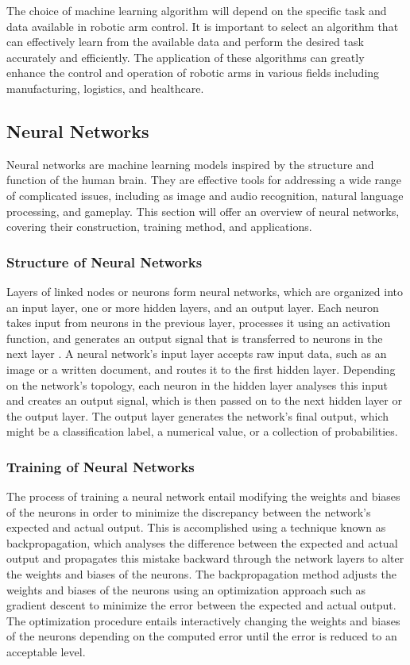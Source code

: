 \documentclass[12pt,oneside]{article}
\begin{document}
The choice of machine learning algorithm will depend on the specific task and data available in robotic arm control. It is important to select an algorithm that can effectively learn from the available data and perform the desired task accurately and efficiently. The application of these algorithms can greatly enhance the control and operation of robotic arms in various fields including manufacturing, logistics, and healthcare.

\subsection{Neural Networks}
Neural networks are machine learning models inspired by the structure and function of the human brain. They are effective tools for addressing a wide range of complicated issues, including as image and audio recognition, natural language processing, and gameplay. This section will offer an overview of neural networks, covering their construction, training method, and applications.

\subsubsection{Structure of Neural Networks}
Layers of linked nodes or neurons form neural networks, which are organized into an input layer, one or more hidden layers, and an output layer. Each neuron takes input from neurons in the previous layer, processes it using an activation function, and generates an output signal that is transferred to neurons in the next layer \cite{43_hamdia2021efficient}.
A neural network's input layer accepts raw input data, such as an image or a written document, and routes it to the first hidden layer. Depending on the network's topology, each neuron in the hidden layer analyses this input and creates an output signal, which is then passed on to the next hidden layer or the output layer. The output layer generates the network's final output, which might be a classification label, a numerical value, or a collection of probabilities.

\subsubsection{Training of Neural Networks}
The process of training a neural network entail modifying the weights and biases of the neurons in order to minimize the discrepancy between the network's expected and actual output. This is accomplished using a technique known as backpropagation, which analyses the difference between the expected and actual output and propagates this mistake backward through the network layers to alter the weights and biases of the neurons.
The backpropagation method adjusts the weights and biases of the neurons using an optimization approach such as gradient descent to minimize the error between the expected and actual output. The optimization procedure entails interactively changing the weights and biases of the neurons depending on the computed error until the error is reduced to an acceptable level.
\end{document}
